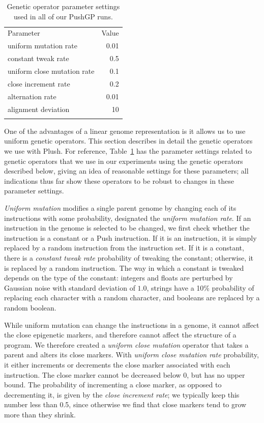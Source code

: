 \documentclass[graybox]{svmult}
\begin{document}
\begin{table}[t]
\centering
\caption{Genetic operator parameter settings used in all of our PushGP runs.}
\label{tableGPconstantParams}
\begin{tabular}{l r}
\hline\noalign{\smallskip}
Parameter & Value \tabularnewline
\noalign{\smallskip}\svhline\noalign{\smallskip}
uniform mutation rate & 0.01 \tabularnewline
constant tweak rate & 0.5 \\
uniform close mutation rate & 0.1 \tabularnewline
close increment rate & 0.2 \\
alternation rate & 0.01 \tabularnewline
alignment deviation & 10 \tabularnewline
\noalign{\smallskip}\hline\noalign{\smallskip}
\end{tabular}
\end{table}

One of the advantages of a linear genome representation is it allows us to use uniform genetic operators. This section describes in detail the genetic operators we use with Plush. For reference, Table~\ref{tableGPconstantParams} has the parameter settings related to genetic operators that we use in our experiments using the genetic operators described below, giving an idea of reasonable settings for these parameters; all indications thus far show these operators to be robust to changes in these parameter settings.

\textit{Uniform mutation} modifies a single parent genome by changing each of its instructions with some probability, designated the \textit{uniform mutation rate}. If an instruction in the genome is selected to be changed, we first check whether the instruction is a constant or a Push instruction. If it is an instruction, it is simply replaced by a random instruction from the instruction set. If it is a constant, there is a \textit{constant tweak rate} probability of tweaking the constant; otherwise, it is replaced by a random instruction. The way in which a constant is tweaked depends on the type of the constant: integers and floats are perturbed by Gaussian noise with standard deviation of $1.0$, strings have a 10\% probability of replacing each character with a random character, and booleans are replaced by a random boolean.

While uniform mutation can change the instructions in a genome, it cannot affect the close epigenetic markers, and therefore cannot affect the structure of a program. We therefore created a \textit{uniform close mutation} operator that takes a parent and alters its close markers. With \textit{uniform close mutation rate} probability, it either increments or decrements the close marker associated with each instruction. The close marker cannot be decreased below 0, but has no upper bound. The probability of incrementing a close marker, as opposed to decrementing it, is given by the \textit{close increment rate}; we typically keep this number less than 0.5, since otherwise we find that close markers tend to grow more than they shrink.
\end{document}

